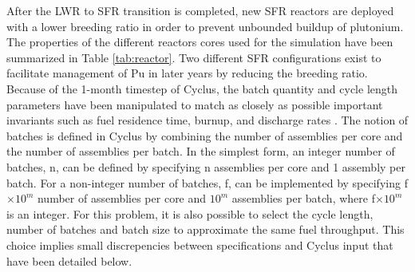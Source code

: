\documentclass[12pt]{article}
\begin{document}
After the LWR to SFR transition is completed, new SFR reactors are deployed
with a lower breeding ratio in order to prevent unbounded buildup of
plutonium. The properties of the different reactors cores used for the
simulation have been summarized in Table \ref{tab:reactor}. Two different SFR 
configurations exist to facilitate management of Pu in later years by reducing
the breeding ratio.  Because of the 1-month timestep of Cyclus, the batch quantity and cycle length
parameters have been manipulated to match as closely as possible important
invariants such as fuel residence time, burnup, and discharge rates
\cite{B.Feng_calculation}. The notion of batches
is defined in Cyclus by combining the number of assemblies per core and 
the number of assemblies per batch.  In the simplest form, an integer number of
batches, n, can be defined by specifying n assemblies per core and 1 assembly
per batch.  For a non-integer number of batches, f, can be implemented by
specifying f$\times 10^m$ number of assemblies per core and $10^m$ assemblies
per batch, where f$\times 10^m$ is an integer.  For this problem, it is also
possible to select the cycle length, number of batches and batch size to
approximate the same fuel throughput.  This choice implies small 
discrepencies between specifications and Cyclus input that have been detailed 
below.
\end{document}
